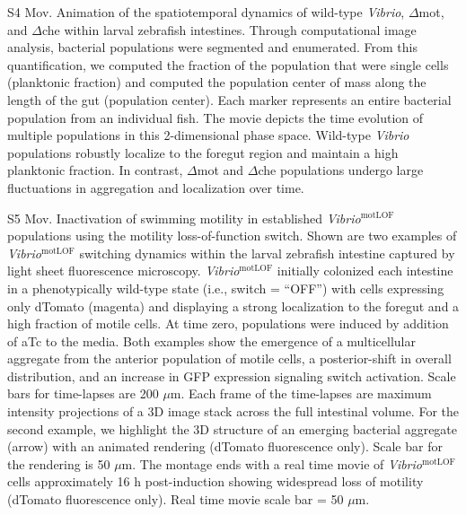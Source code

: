 S4 Mov. Animation of the spatiotemporal dynamics of wild-type \textit{Vibrio}, $\Delta$mot, and $\Delta$che within larval zebrafish intestines. 
Through computational image analysis, bacterial populations were segmented and enumerated. From this quantification, we computed the fraction of the population that were single cells (planktonic fraction) and computed the population center of mass along the length of the gut (population center). Each marker represents an entire bacterial population from an individual fish. The movie depicts the time evolution of multiple populations in this 2-dimensional phase space. Wild-type \textit{Vibrio} populations robustly localize to the foregut region and maintain a high planktonic fraction. In contrast, $\Delta$mot and $\Delta$che populations undergo large fluctuations in aggregation and localization over time.

S5 Mov. Inactivation of swimming motility in established \textit{Vibrio}$^{\text{motLOF}}$ populations using the motility loss-of-function switch. 
Shown are two examples of \textit{Vibrio}$^{\text{motLOF}}$ switching dynamics within the larval zebrafish intestine captured by light sheet fluorescence microscopy. \textit{Vibrio}$^{\text{motLOF}}$ initially colonized each intestine in a phenotypically wild-type state (i.e., switch = ``OFF'') with cells expressing only dTomato (magenta) and displaying a strong localization to the foregut and a high fraction of motile cells.  At time zero, populations were induced by addition of aTc to the media. Both examples show the emergence of a multicellular aggregate from the anterior population of motile cells, a posterior-shift in overall distribution, and an increase in GFP expression signaling switch activation. Scale bars for time-lapses are 200 $\mu$m. Each frame of the time-lapses are maximum intensity projections of a 3D image stack across the full intestinal volume. For the second example, we highlight the 3D structure of an emerging bacterial aggregate (arrow) with an animated rendering (dTomato fluorescence only). Scale bar for the rendering is 50 $\mu$m. The montage ends with a real time movie of \textit{Vibrio}$^{\text{motLOF}}$ cells approximately 16 h post-induction showing widespread loss of motility (dTomato fluorescence only). Real time movie scale bar = 50 $\mu$m. 


